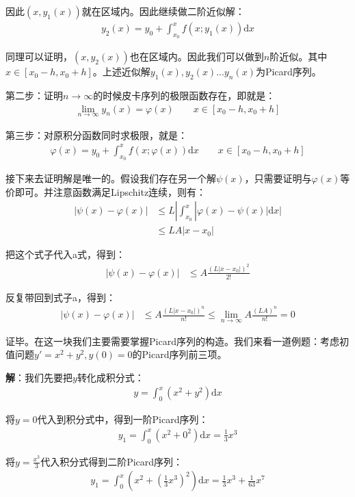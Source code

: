 \documentclass{ctexart}
\let\oldtextbf\textbf
\renewcommand{\textbf}[1]{\textcolor{brown!50!red}{\oldtextbf{#1}}}
\begin{document}
因此$(x,y_1(x))$就在区域内。因此继续做二阶近似解：
\begin{align*} 
  y_2(x)=y_0+\int_{x_0}^x f(x;y_1(x))\mathrm{d}x 
\end{align*}

同理可以证明，$(x,y_2(x))$也在区域内。因此我们可以做到$n$阶近似。其中$x\in[x_0-h,x_0+h]$。上述近似解$y_1(x),y_2(x)...y_n(x)$为Picard序列。

第二步：证明$n\to\infty$的时候皮卡序列的极限函数存在，即就是：
\begin{align*} 
  \lim_{n\to\infty}y_n(x)=\varphi(x)\qquad x\in[x_0-h,x_0+h]
\end{align*}

第三步：对原积分函数同时求极限，就是：
\begin{align*} \varphi(x)=y_0+\int_{x_0}^{x}f(x;\varphi(x))\mathrm{d}x \qquad x\in[x_0-h,x_0+h]\tag{a}
\end{align*}

接下来去证明解是唯一的。假设我们存在另一个解$\psi(x)$，只需要证明与$\varphi(x)$等价即可。并注意函数满足Lipschitz连续，则有：
\begin{align*}
|\psi(x)-\varphi(x)|&\leq L|\int _{x_0}^x|\varphi(x)-\psi(x) |\mathrm{d}x |\\
&\leq LA|x-x_0|
\end{align*}

把这个式子代入a式，得到：
\begin{align*}
|\psi(x)-\varphi(x)|&\leq A\frac{(L|x-x_0|)^2}{2!}
\end{align*}

反复带回到式子a，得到：
\begin{align*}
|\psi(x)-\varphi(x)|&\leq A\frac{(L|x-x_0|)^n}{n!}\leq \lim_{n\to\infty}A\frac{(LA)^n}{n!}=0 
\end{align*}

证毕。在这一块我们主要需要掌握Picard序列的构造。我们来看一道例题：考虑初值问题$y'=x^2+y^2,y(0)=0$的Picard序列前三项。

\textbf{\color{brown!50!red}解}：我们先要把$y$转化成积分式：
\begin{align*}
y=\int_0^{x}(x^2+y^2)\mathrm{d}x 
\end{align*}

将$y=0$代入到积分式中，得到一阶Picard序列：
\begin{align*}
y_1=\int_0^{x}(x^2+0^2)\mathrm{d}x=\frac{1}{3}x^3  
\end{align*}

将$y=\frac{x^3}{3}$代入积分式得到二阶Picard序列：
\begin{align*}
y_1=\int_0^{x}(x^2+(\frac{1}{3}x ^3)^2)\mathrm{d}x=\frac{1}{3}x^3  +\frac{1}{63}x^7 
\end{align*}
\end{document}
